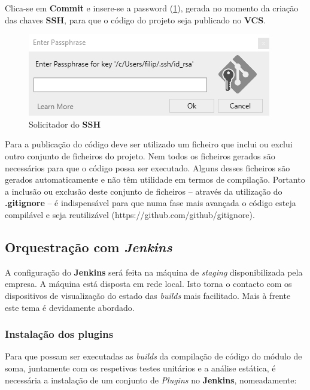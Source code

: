 Clica-se em \textbf{Commit} e insere-se a password (\ref{Fig:Fig26}), gerada no momento da criação das chaves \textbf{SSH}, para que o código do projeto seja publicado no \textbf{VCS}.

\begin{figure}[hbt!]
\centering
\includegraphics[width=0.5\linewidth]{Cap5/TeamExplorerSSHPassword.png}
\caption{Solicitador do \textbf{SSH}}
\label{Fig:Fig26}
\end{figure}

\hspace{1cm}Para a publicação do código deve ser utilizado um ficheiro que inclui ou exclui outro conjunto de ficheiros do projeto. Nem todos os ficheiros gerados são necessários para que o código possa ser executado. Alguns desses ficheiros são gerados automaticamente e não têm utilidade em termos de compilação. Portanto a inclusão ou exclusão deste conjunto de ficheiros -- através da utilização do \textbf{.gitignore} -- é indispensável para que numa fase mais avançada o código esteja compilável e seja reutilizável (https://github.com/github/gitignore). 

\subsection{Orquestração com \textit{Jenkins}}

\hspace{1cm}A configuração do \textbf{Jenkins} será feita na máquina de \textit{staging} disponibilizada pela empresa. A máquina está disposta em rede local. Isto torna o contacto com os dispositivos de visualização do estado das \textit{builds} mais facilitado. Mais à frente este tema é devidamente abordado.

\subsubsection{Instalação dos plugins}

\hspace{1cm}Para que possam ser executadas as \textit{builds} da compilação de código do módulo de soma, juntamente com os respetivos testes unitários e a análise estática, é necessária a instalação de um conjunto de \textit{Plugins} no \textbf{Jenkins}, nomeadamente:

